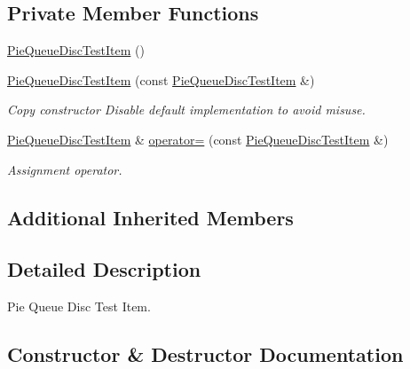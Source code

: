 \subsection*{Private Member Functions}
\begin{DoxyCompactItemize}
\item 
\hyperlink{classPieQueueDiscTestItem_a59540cdc80e36bdd7217ac10597d85f4}{Pie\+Queue\+Disc\+Test\+Item} ()
\item 
\hyperlink{classPieQueueDiscTestItem_a4a63bc4281296feb867f4ecc58d14461}{Pie\+Queue\+Disc\+Test\+Item} (const \hyperlink{classPieQueueDiscTestItem}{Pie\+Queue\+Disc\+Test\+Item} \&)
\begin{DoxyCompactList}\small\item\em Copy constructor Disable default implementation to avoid misuse. \end{DoxyCompactList}\item 
\hyperlink{classPieQueueDiscTestItem}{Pie\+Queue\+Disc\+Test\+Item} \& \hyperlink{classPieQueueDiscTestItem_a22e5533324d2c3768e6064cfec96cb74}{operator=} (const \hyperlink{classPieQueueDiscTestItem}{Pie\+Queue\+Disc\+Test\+Item} \&)
\begin{DoxyCompactList}\small\item\em Assignment operator. \end{DoxyCompactList}\end{DoxyCompactItemize}
\subsection*{Additional Inherited Members}


\subsection{Detailed Description}
Pie Queue Disc Test Item. 

\subsection{Constructor \& Destructor Documentation}
